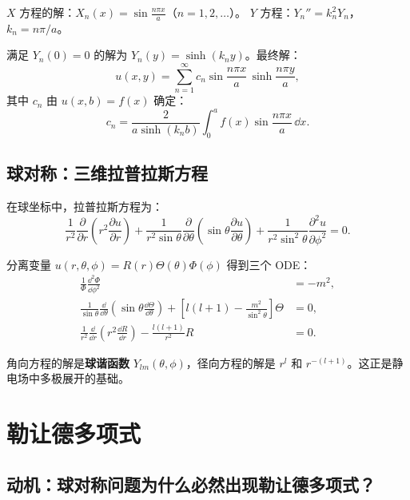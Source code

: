 $X$ 方程的解：$X_n(x) = \sin\frac{n\pi x}{a}$（$n=1,2,\dots$）。
$Y$ 方程：$Y_n'' = k_n^2 Y_n$，$k_n = n\pi/a$。

满足 $Y_n(0)=0$ 的解为 $Y_n(y) = \sinh(k_n y)$。最终解：
\begin{equation}
u(x,y) = \sum_{n=1}^{\infty} c_n \sin\frac{n\pi x}{a}\,
\sinh\frac{n\pi y}{a},
\end{equation}
其中 $c_n$ 由 $u(x,b)=f(x)$ 确定：
\begin{equation}
c_n = \frac{2}{a\sinh(k_n b)}\int_0^a f(x)\sin\frac{n\pi x}{a}\,\dd x.
\end{equation}

\subsection{球对称：三维拉普拉斯方程}

在球坐标中，拉普拉斯方程为：
\begin{equation}
\frac{1}{r^2}\frac{\partial}{\partial r}\left(r^2\frac{\partial u}{\partial r}\right)
+ \frac{1}{r^2\sin\theta}\frac{\partial}{\partial\theta}\left(\sin\theta\frac{\partial u}{\partial\theta}\right)
+ \frac{1}{r^2\sin^2\theta}\frac{\partial^2 u}{\partial\phi^2} = 0.
\end{equation}

分离变量 $u(r,\theta,\phi) = R(r)\Theta(\theta)\Phi(\phi)$ 得到三个 ODE：
\begin{align}
\frac{1}{\Phi}\frac{\dd^2\Phi}{\dd\phi^2} &= -m^2,\\
\frac{1}{\sin\theta}\frac{\dd}{\dd\theta}\left(\sin\theta\frac{\dd\Theta}{\dd\theta}\right)
+ \left[l(l+1) - \frac{m^2}{\sin^2\theta}\right]\Theta &= 0,\\
\frac{1}{r^2}\frac{\dd}{\dd r}\left(r^2\frac{\dd R}{\dd r}\right)
- \frac{l(l+1)}{r^2}R &= 0.
\end{align}

角向方程的解是\textbf{球谐函数} $Y_{lm}(\theta,\phi)$，径向方程的解是 $r^l$ 和 $r^{-(l+1)}$。这正是静电场中多极展开的基础。

\section{勒让德多项式}
\label{sec:legendre}

\subsection*{动机：球对称问题为什么必然出现勒让德多项式？}

